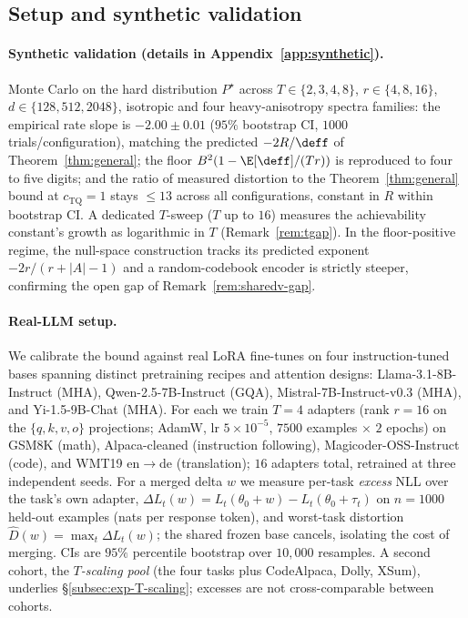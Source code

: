 \subsection{Setup and synthetic validation}
\label{subsec:exp-setup}\label{subsec:exp-synthetic}\label{subsec:exp-T-synthetic}

\paragraph{Synthetic validation (details in
Appendix~\ref{app:synthetic}).} Monte Carlo on the hard distribution
$P^\star$ across $T\in\{2,3,4,8\}$, $r\in\{4,8,16\}$,
$d\in\{128,512,2048\}$, isotropic and four heavy-anisotropy spectra
families: the empirical rate slope is $-2.00 \pm 0.01$ ($95\%$
bootstrap CI, $1000$ trials/configuration), matching the predicted
$-2R/\deff$ of Theorem~\ref{thm:general}; the floor
$B^2(1 - \E[\deff]/(Tr))$ is reproduced to four to five digits; and
the ratio of measured distortion to the Theorem~\ref{thm:general}
bound at $c_{\mathrm{TQ}} = 1$ stays $\leq 13$ across all
configurations, constant in $R$ within bootstrap CI. A
dedicated $T$-sweep ($T$ up to $16$) measures the achievability
constant's growth as logarithmic in $T$ (Remark~\ref{rem:tgap}). In the
floor-positive regime, the null-space construction tracks its predicted
exponent $-2r/(r+|A|-1)$ and a random-codebook encoder is strictly
steeper, confirming the open gap of Remark~\ref{rem:sharedv-gap}.

\paragraph{Real-LLM setup.} We calibrate the bound against real LoRA
fine-tunes on four instruction-tuned bases spanning distinct
pretraining recipes and attention designs: Llama-3.1-8B-Instruct (MHA),
Qwen-2.5-7B-Instruct (GQA), Mistral-7B-Instruct-v0.3 (MHA), and
Yi-1.5-9B-Chat (MHA). For each we train $T=4$ adapters (rank $r = 16$
on the $\{q,k,v,o\}$ projections; AdamW, lr $5\times10^{-5}$, $7500$
examples $\times$ $2$ epochs) on GSM8K (math), Alpaca-cleaned
(instruction following), Magicoder-OSS-Instruct (code), and WMT19
en$\to$de (translation); $16$ adapters total, retrained at three
independent seeds. For a merged delta $w$ we measure per-task
\emph{excess} NLL over the task's own adapter,
$\Delta L_t(w) = L_t(\theta_0 + w) - L_t(\theta_0 + \tau_t)$ on
$n = 1000$ held-out examples (nats per response token), and worst-task
distortion $\widehat D(w) = \max_t \Delta L_t(w)$; the shared frozen
base cancels, isolating the cost of merging. CIs are $95\%$ percentile
bootstrap over $10{,}000$ resamples. A second cohort, the
\emph{$T$-scaling pool} (the four tasks plus CodeAlpaca, Dolly, XSum),
underlies \S\ref{subsec:exp-T-scaling}; excesses are not
cross-comparable between cohorts.

